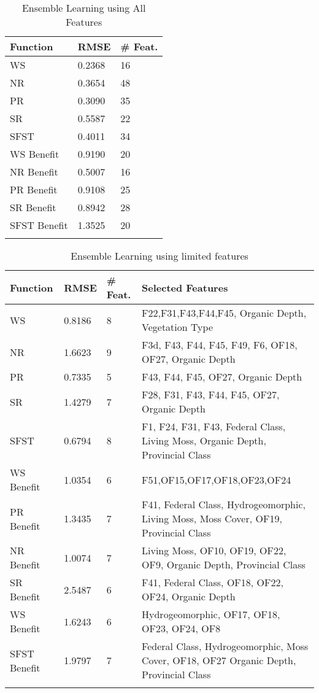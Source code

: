 \begin{longtable}{|p{3cm}|p{2cm}|p{2cm}|}
\hline
\textbf{Function} & \textbf{RMSE} & \textbf{\# Feat.} \\ \hline

WS & 0.2368 & 16  \\ \hline
NR & 0.3654 & 48  \\ \hline
PR &  0.3090 & 35 \\ \hline
SR &  0.5587 & 22  \\ \hline
SFST &  0.4011 & 34  \\ \hline
WS Benefit & 0.9190 & 20  \\ \hline
NR Benefit &  0.5007 & 16 \\ \hline
PR Benefit &  0.9108 & 25  \\ \hline
SR Benefit &  0.8942 & 28  \\ \hline
SFST Benefit & 1.3525  & 20   \\ \hline
\caption{Ensemble Learning using All Features}
\label{fig_mse_specxtra:lowest_best_rmse_featred}
\end{longtable}

\begin{longtable}{|p{3cm}|p{2cm}|p{2cm}|p{8cm}|}
\hline
\textbf{Function} & \textbf{RMSE} & \textbf{\# Feat.} & \textbf{Selected Features} \\ \hline

WS & 0.8186 & 8 & F22,F31,F43,F44,F45, Organic Depth, Vegetation Type \\ \hline
NR & 1.6623 & 9 & F3d, F43, F44, F45, F49, F6, OF18, OF27, Organic Depth \\ \hline
PR &  0.7335 & 5 & F43, F44, F45, OF27, Organic Depth \\ \hline
SR &  1.4279 & 7 & F28, F31, F43, F44, F45, OF27, Organic Depth\\ \hline
SFST &  0.6794 & 8 & F1, F24, F31, F43, Federal Class, Living Moss, Organic Depth, Provincial Class\\ \hline
WS Benefit & 1.0354 & 6 & F51,OF15,OF17,OF18,OF23,OF24 \\ \hline
PR Benefit &  1.3435 & 7 & F41, Federal Class, Hydrogeomorphic, Living Moss, Moss Cover, OF19, Provincial Class\\ \hline
NR Benefit &  1.0074 & 7 &  Living Moss, OF10, OF19, OF22, OF9, Organic Depth, Provincial Class\\ \hline
SR Benefit &  2.5487 & 6 &  F41, Federal Class, OF18, OF22, OF24, Organic Depth \\ \hline
WS Benefit &  1.6243 & 6 &  Hydrogeomorphic, OF17, OF18, OF23, OF24, OF8 \\ \hline
SFST Benefit & 1.9797  & 7 & Federal Class, Hydrogeomorphic, Moss Cover, OF18, OF27 Organic Depth, Provincial Class\\ \hline
\caption{Ensemble Learning using limited features}
\label{fig_mse_specxtra:lowest_smallest_rmse_featred}
\end{longtable}